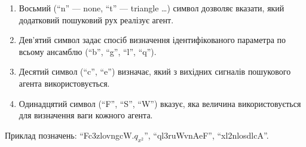 \documentclass[14pt,handout,utf8]{beamer}
\begin{document}
\begin{frame}
\begin{enumerate}
    \item
      Восьмий (``n'' --- none, ``t'' --- triangle \ldots ) символ дозволяє вказати,
      який додатковий пошуковий рух реалізує агент.

    \item
      Дев'ятий символ задає спосіб визначення ідентифікованого параметра по всьому ансамблю (``b'', ``g'', ``l'', ``q'').


    \item
      Десятий символ (``c'', ``e'') визначає, який з вихідних сигналів пошукового агента використовується.

    \item
      Одинадцятий символ (``F'', ``S'', ``W'') вказує,
      яка величина використовується для визначення ваги кожного агента.


  \end{enumerate}

Приклад позначень:
``Fc3zlovngcW.$q_{x^2}$'',
``ql3ruWvnAeF'',
``xl2nlosdlcA''.

\end{frame}


\end{document}
